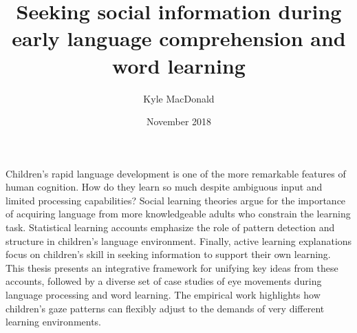\documentclass[oneside]{report}
\begin{document}
\title{Seeking social information during early language comprehension and word
learning}
\author{Kyle MacDonald}
\date{November 2018}


\makeatletter
\def\maxwidth{ %
  \ifdim\Gin@nat@width>\linewidth
    \linewidth
  \else
    \Gin@nat@width
  \fi
}
\makeatother

\renewcommand{\contentsname}{Contents}

\setlength{\parskip}{0pt}


\providecommand{\tightlist}{%
  \setlength{\itemsep}{0pt}\setlength{\parskip}{0pt}}




\beforepreface
{}
Children's rapid language development is one of the more remarkable
features of human cognition. How do they learn so much despite ambiguous
input and limited processing capabilities? Social learning theories
argue for the importance of acquiring language from more knowledgeable
adults who constrain the learning task. Statistical learning accounts
emphasize the role of pattern detection and structure in children's
language environment. Finally, active learning explanations focus on
children's skill in seeking information to support their own learning.
This thesis presents an integrative framework for unifying key ideas
from these accounts, followed by a diverse set of case studies of eye
movements during language processing and word learning. The empirical
work highlights how children's gaze patterns can flexibly adjust to the
demands of very different learning environments.
\end{document}
